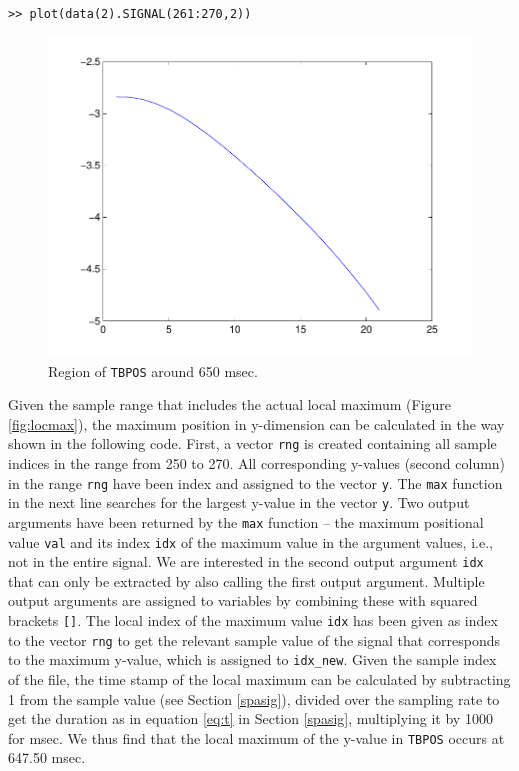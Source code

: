 \documentclass[a4paper, 12pt]{article}
\begin{document}
\begin{verbatim}
>> plot(data(2).SIGNAL(261:270,2))
\end{verbatim}


\setlength\intextsep{-3pt}
\begin{figure}
\includegraphics[scale=0.45]{TMPOS.pdf}%
\caption{Region of \texttt{TBPOS} around 650 msec.}\label{fig:TMPOS}
\end{figure}


Given the sample range that includes the actual local maximum (Figure \ref{fig:locmax}), the maximum position in y-dimension can be calculated in the way shown in the following code. First, a vector \texttt{rng} is created containing all sample indices in the range from 250 to 270. All corresponding y-values (second column) in the range \texttt{rng} have been index and assigned to the vector \texttt{y}. The \texttt{max} function in the next line searches for the largest y-value in the vector \texttt{y}. Two output arguments have been returned by the \texttt{max} function -- the maximum positional value \texttt{val} and its index \texttt{idx} of the maximum value in the argument values, i.e., not in the entire signal. We are interested in the second output argument \texttt{idx} that can only be extracted by also calling the first output argument. Multiple output arguments are assigned to variables by combining these with squared brackets \texttt{[]}. The local index of the maximum value \texttt{idx} has been given as index to the vector \texttt{rng} to get the relevant sample value of the signal that corresponds to the maximum y-value, which is assigned to \texttt{idx\_new}. Given the sample index of the file, the time stamp of the local maximum can be calculated by subtracting 1 from the sample value (see Section \ref{spasig}), divided over the sampling rate to get the duration as in equation \eqref{eq:t} in Section \ref{spasig}, multiplying it by 1000 for msec. We thus find that the local maximum of the y-value in \texttt{TBPOS} occurs at 647.50 msec.
\end{document}
